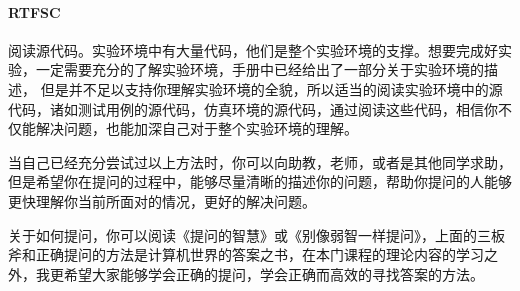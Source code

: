 \paragraph{\bfseries RTFSC} 阅读源代码。实验环境中有大量代码，他们是整个实验环境的支撑。想要完成好实验，一定需要充分的了解实验环境，手册中已经给出了一部分关于实验环境的描述，
但是并不足以支持你理解实验环境的全貌，所以适当的阅读实验环境中的源代码，诸如测试用例的源代码，仿真环境的源代码，通过阅读这些代码，相信你不仅能解决问题，也能加深自己对于整个实验环境的理解。

当自己已经充分尝试过以上方法时，你可以向助教，老师，或者是其他同学求助，但是希望你在提问的过程中，能够尽量清晰的描述你的问题，帮助你提问的人能够更快理解你当前所面对的情况，更好的解决问题。

关于如何提问，你可以阅读《提问的智慧》或《别像弱智一样提问》，上面的三板斧和正确提问的方法是计算机世界的答案之书，在本门课程的理论内容的学习之外，我更希望大家能够学会正确的提问，学会正确而高效的寻找答案的方法。